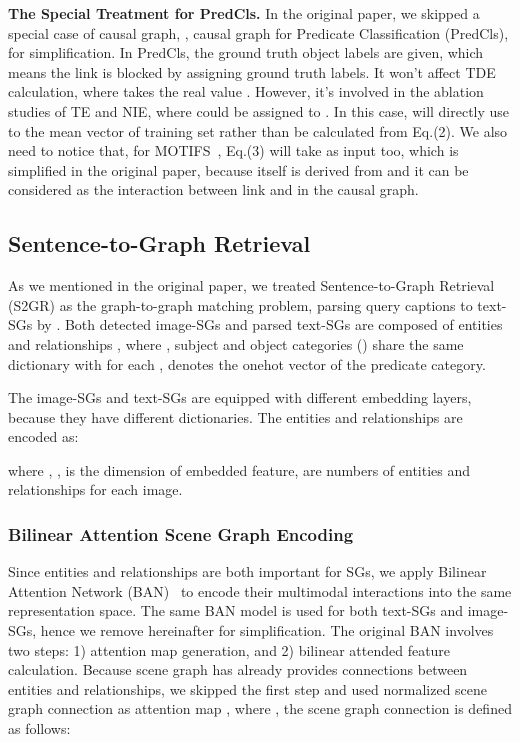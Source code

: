 \documentclass[10pt,twocolumn,letterpaper]{article}
\begin{document}
\noindent\textbf{The Special Treatment for PredCls.} In the original paper, we skipped a special case of causal graph, \ie, causal graph for Predicate Classification (PredCls), for simplification. In PredCls, the ground truth object labels are given, which means the link  is blocked by assigning ground truth labels. It won't affect TDE calculation, where  takes the real value . However, it's involved in the ablation studies of TE and NIE, where  could be assigned to . In this case,  will directly use to the mean vector of training set rather than be calculated from Eq.(2). We also need to notice that, for MOTIFS~\cite{zellers2018neural}, Eq.(3) will take  as input too, which is simplified in the original paper, because  itself is derived from  and it can be considered as the interaction between link  and  in the causal graph.


\subsection{Sentence-to-Graph Retrieval}
As we mentioned in the original paper, we treated Sentence-to-Graph Retrieval (S2GR) as the graph-to-graph matching problem, parsing query captions to text-SGs by \cite{schuster2015generating}. Both detected image-SGs and parsed text-SGs are composed of entities  and relationships , where , subject and object categories () share the same dictionary with  for each ,  denotes the onehot vector of the predicate category. 

The image-SGs and text-SGs are equipped with different embedding layers, because they have different dictionaries. The entities and relationships are encoded as:

where , ,  is the dimension of embedded feature,  are numbers of entities and relationships for each image. 

\subsubsection{Bilinear Attention Scene Graph Encoding}
Since entities and relationships are both important for SGs, we apply Bilinear Attention Network (BAN)~\cite{kim2018bilinear} to encode their multimodal interactions into the same representation space. The same BAN model is used for both text-SGs and image-SGs, hence we remove  hereinafter for simplification. The original BAN involves two steps: 1) attention map generation, and 2) bilinear attended feature calculation. Because scene graph has already provides connections between entities and relationships, we skipped the first step and used normalized scene graph connection as attention map , where , the scene graph connection  is defined as follows:
\end{document}
